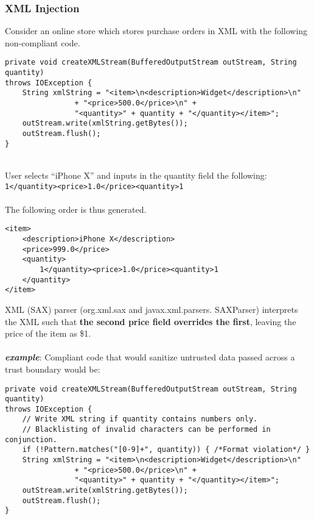\documentclass[a4paper]{article}
\begin{document}
\subsubsection{XML Injection}
Consider an online store which stores purchase orders in XML with the following non-compliant code.
\begin{verbatim}
private void createXMLStream(BufferedOutputStream outStream, String quantity) 
throws IOException {
	String xmlString = "<item>\n<description>Widget</description>\n" 
				+ "<price>500.0</price>\n" +
				"<quantity>" + quantity + "</quantity></item>";
	outStream.write(xmlString.getBytes());
	outStream.flush();
}
\end{verbatim}
\mbox{}\\
User selects “iPhone X” and inputs in the quantity field the following: \texttt{1</quantity><price>1.0</price><quantity>1}\\
\\
The following order is thus generated.
\begin{verbatim}
<item>
	<description>iPhone X</description>
	<price>999.0</price>
	<quantity>
		1</quantity><price>1.0</price><quantity>1
	</quantity>
</item>
\end{verbatim}
XML (SAX) parser (org.xml.sax and javax.xml.parsers. SAXParser) interprets the XML such that \textbf{the second price field overrides the first}, leaving the price of the item as \$1.\\
\\
\newpage
\noindent \textbf{\textit{example}}: Compliant code that would sanitize untrusted data passed across a trust boundary would be:
\begin{verbatim}
private void createXMLStream(BufferedOutputStream outStream, String quantity) 
throws IOException {
	// Write XML string if quantity contains numbers only.
	// Blacklisting of invalid characters can be performed in conjunction.
	if (!Pattern.matches("[0-9]+", quantity)) { /*Format violation*/ }
	String xmlString = "<item>\n<description>Widget</description>\n" 
				+ "<price>500.0</price>\n" +
				"<quantity>" + quantity + "</quantity></item>";
	outStream.write(xmlString.getBytes());
	outStream.flush();
}
\end{verbatim}
\end{document}
